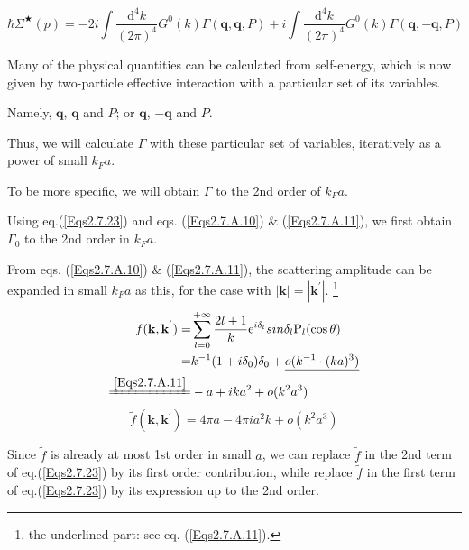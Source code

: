 \begin{equation} \label{Eqs2.7.25}
\hbar \Sigma^{\bigstar}(p) = -2 i \int \frac{\mathrm{d}^4 k}{(2\pi)^4} G^0(k)\Gamma(\mathbf{q},\mathbf{q},P) + i \int \frac{\mathrm{d}^4 k}{(2\pi)^4} G^0(k)\Gamma(\mathbf{q},-\mathbf{q},P)
\end{equation}

Many of the physical quantities can be calculated from self-energy, which is now given by two-particle effective interaction with a particular set of its variables.

Namely, $\mathbf{q}$, $\mathbf{q}$ and $P$; or $\mathbf{q}$, $-\mathbf{q}$ and $P$.

Thus, we will calculate $\Gamma$ with these particular set of variables, iteratively as a power of small $k_F a$.

To be more specific, we will obtain $\Gamma$ to the 2nd order of $k_F a$.

Using eq.(\ref{Eqs2.7.23}) and eqs. (\ref{Eqs2.7.A.10}) \& (\ref{Eqs2.7.A.11}), we first obtain $\Gamma_0$ to the 2nd order in $k_F a$.

From eqs. (\ref{Eqs2.7.A.10}) \& (\ref{Eqs2.7.A.11}), the scattering amplitude can be expanded in small $k_F a$ as this, for the case with $|\mathbf{k}|=|\mathbf{k}^{'}|$.
\footnote{the underlined part: see eq. (\ref{Eqs2.7.A.11}).}
\[ \begin{split} f(\mathbf{k},\mathbf{k}^{'}) =& \sum_{l=0}^{+\infty} \frac{2l+1}{k} \mathrm{e}^{i \delta_l} sin \delta_l \mathrm{P}_l(\cos\theta)\\
=& k^{-1} (1+i \delta_0) \delta_0 + \underline{o(k^{-1} \cdot (k a)^3)}\\
\xlongequal{\ref{Eqs2.7.A.11}}& -a + i k a^2 + o(k^2 a^3)
\end{split} \]
\[ \tilde{f}(\mathbf{k},\mathbf{k}^{'}) = 4\pi a - 4\pi i a^2 k + o(k^2 a^3) \]

Since $\tilde{f}$ is already at most 1st order in small $a$, we can replace $\tilde{f}$ in the 2nd term of eq.(\ref{Eqs2.7.23}) by its first order contribution, while replace $\tilde{f}$ in the first term of eq.(\ref{Eqs2.7.23}) by its expression up to the 2nd order.

